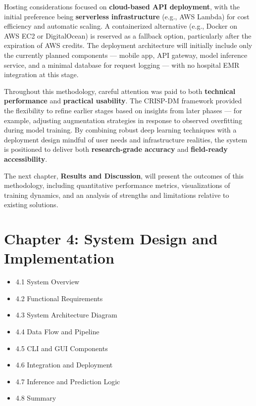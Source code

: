 \documentclass[
  12pt,
  oneside]{article}
\providecommand{\tightlist}{%
  \setlength{\itemsep}{0pt}\setlength{\parskip}{0pt}}
\begin{document}
Hosting considerations focused on \textbf{cloud-based API deployment},
with the initial preference being \textbf{serverless infrastructure}
(e.g., AWS Lambda) for cost efficiency and automatic scaling. A
containerized alternative (e.g., Docker on AWS EC2 or DigitalOcean) is
reserved as a fallback option, particularly after the expiration of AWS
credits. The deployment architecture will initially include only the
currently planned components --- mobile app, API gateway, model
inference service, and a minimal database for request logging --- with
no hospital EMR integration at this stage.

Throughout this methodology, careful attention was paid to both
\textbf{technical performance} and \textbf{practical usability}. The
CRISP-DM framework provided the flexibility to refine earlier stages
based on insights from later phases --- for example, adjusting
augmentation strategies in response to observed overfitting during model
training. By combining robust deep learning techniques with a deployment
design mindful of user needs and infrastructure realities, the system is
positioned to deliver both \textbf{research-grade accuracy} and
\textbf{field-ready accessibility}.

The next chapter, \textbf{Results and Discussion}, will present the
outcomes of this methodology, including quantitative performance
metrics, visualizations of training dynamics, and an analysis of
strengths and limitations relative to existing solutions.

\newpage

\section{Chapter 4: System Design and
Implementation}\label{chapter-4-system-design-and-implementation}

\begin{itemize}
\tightlist
\item
  4.1 System Overview
\item
  4.2 Functional Requirements
\item
  4.3 System Architecture Diagram
\item
  4.4 Data Flow and Pipeline
\item
  4.5 CLI and GUI Components
\item
  4.6 Integration and Deployment
\item
  4.7 Inference and Prediction Logic
\item
  4.8 Summary
\end{itemize}
\end{document}

